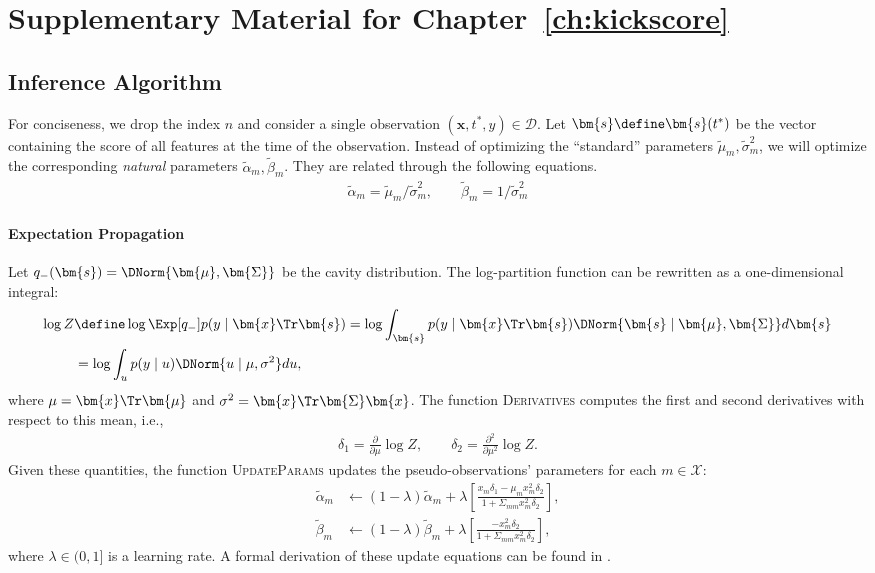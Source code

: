 \section{Supplementary Material for Chapter~\ref{ch:kickscore}}
\label{kks:app:suppmat}

\subsection{Inference Algorithm}
\label{kks:app:inference}

For conciseness, we drop the index $n$ and consider a single observation $(\bm{x}, t^*, y) \in \mathcal{D}$.
Let $\bm{s} \define \bm{s}(t^*)$ be the vector containing the score of all features at the time of the observation.
Instead of optimizing the ``standard'' parameters $\tilde{\mu}_m, \tilde{\sigma}^2_m$, we will optimize the corresponding \emph{natural} parameters $\tilde{\alpha}_m, \tilde{\beta}_m$.
They are related through the following equations.
\begin{align*}
	\tilde{\alpha}_m = \tilde{\mu}_m / \tilde{\sigma}^2_m, \qquad
	\tilde{\beta}_m = 1 / \tilde{\sigma}^2_m
\end{align*}

\paragraph{Expectation Propagation}

Let $q_{-}(\bm{s}) = \DNorm{\bm{\mu}, \bm{\Sigma}}$ be the cavity distribution.
The log-partition function can be rewritten as a one-dimensional integral:
\begin{align*}
	\log Z
	 & \define \log \Exp[q_{-}]{ p(y \mid \bm{x}\Tr \bm{s}) }
	= \log \int_{\bm{s}} p(y \mid \bm{x}\Tr \bm{s}) \DNorm{\bm{s} \mid \bm{\mu}, \bm{\Sigma}} d\bm{s} \\
	 & = \log \int_{u} p(y \mid u) \DNorm{u \mid \mu, \sigma^2} du,
\end{align*}
where $\mu = \bm{x}\Tr \bm{\mu}$ and $\sigma^2 = \bm{x}\Tr \bm{\Sigma} \bm{x}$.
The function \textsc{Derivatives} computes the first and second derivatives with respect to this mean, i.e.,
\begin{align*}
	\delta_1 = \frac{\partial}{\partial \mu} \log Z, \qquad
	\delta_2 = \frac{\partial^2}{\partial \mu^2} \log Z.
\end{align*}
Given these quantities, the function \textsc{UpdateParams} updates the pseudo-observations' parameters for each $m \in \mathcal{X}$:
\begin{align*}
	\tilde{\alpha}_m & \gets (1 - \lambda) \tilde{\alpha}_m
	+ \lambda \left[ \frac{x_m \delta_1 - \mu_m x_m^2 \delta_2}{1 + \Sigma_{mm} x_m^2 \delta_2} \right], \\
	\tilde{\beta}_m  & \gets (1 - \lambda) \tilde{\beta}_m
	+ \lambda \left[ \frac{-x_m^2 \delta_2}{1 + \Sigma_{mm} x_m^2 \delta_2} \right],
\end{align*}
where $\lambda \in (0, 1]$ is a learning rate.
A formal derivation of these update equations can be found in \citet{seeger2007bayesian, rasmussen2006gaussian, minka2001family}.

